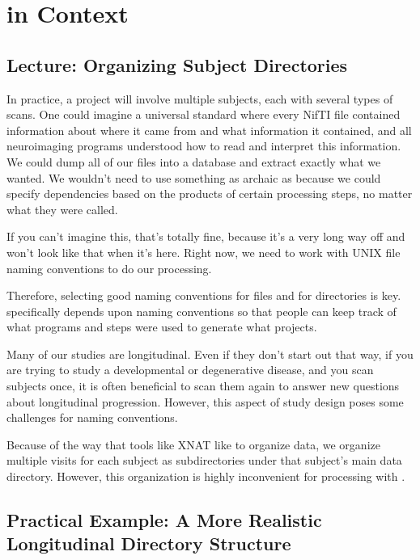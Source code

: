 \chapter{ \maken{} in Context}

\section{Lecture: Organizing Subject Directories }

In practice, a project will involve multiple subjects, each with
several types of scans. One could imagine a universal standard where
every NifTI file contained information about where it came from and
what information it contained, and all neuroimaging programs
understood how to read and interpret this information. We could dump
all of our files into a database and extract exactly what we
wanted. We wouldn't need to use something as archaic as \maken{} because
we could specify dependencies based on the products of certain
processing steps, no matter what they were called.

If you can't imagine this, that's totally fine, because it's a very
long way off and won't look like that when it's here. Right now, we
need to work with UNIX file naming conventions to do our processing.

Therefore, selecting good naming conventions for files and for
directories is key. \maken{} specifically depends upon naming
conventions so that people can keep track of what programs and steps
were used to generate what projects.


Many of our studies are longitudinal. Even if they don't start out
that way, if you are trying to study a developmental or degenerative
disease, and you scan subjects once, it is often beneficial to scan
them again to answer new questions about longitudinal
progression. However, this aspect of study design poses some
challenges for naming conventions. 

Because of the way that tools like XNAT like to organize data, we
organize multiple visits for each subject as subdirectories under that
subject's main data directory. However, this organization is highly
inconvenient for processing with \maken{}.  


\section{Practical Example: A More Realistic Longitudinal Directory Structure}

